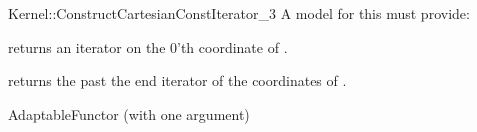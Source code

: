 \begin{ccRefFunctionObjectConcept}{Kernel::ConstructCartesianConstIterator_3}
A model for this must provide:



 {returns an iterator on the 0'th  coordinate of .}

 {returns the past the end iterator of the  coordinates of .}




\ccRefines
AdaptableFunctor (with one argument)


\ccSeeAlso
{} \\


\end{ccRefFunctionObjectConcept}
